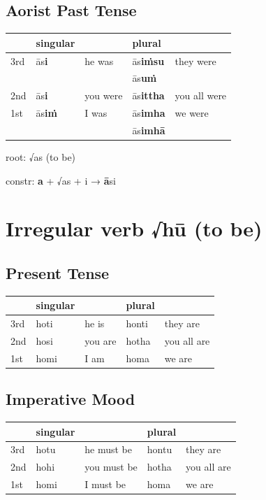 \documentclass[11pt,oneside]{memoir}
\begin{document}
\subsection{Aorist Past Tense}
\label{sec:orgc97d9e9}

\begin{center}
\begin{tabular}{lllll}
 & singular &  & plural & \\
\hline
3rd & ās\textbf{i} & he was & ās\textbf{iṁsu} & they were\\
 &  &  & ās\textbf{uṁ} & \\
2nd & ās\textbf{i} & you were & ās\textbf{ittha} & you all were\\
1st & ās\textbf{iṁ} & I was & ās\textbf{imha} & we were\\
 &  &  & ās\textbf{imhā} & \\
\end{tabular}
\end{center}

root: √as (to be)

constr: \textbf{a} + √as + i → \textbf{ā}si

\clearpage
\section{Irregular verb √hū (to be)}
\label{sec:orgb8c851c}
\subsection{Present Tense}
\label{sec:org320b42c}

\begin{center}
\begin{tabular}{lllll}
 & singular &  & plural & \\
\hline
3rd & hoti & he is & honti & they are\\
2nd & hosi & you are & hotha & you all are\\
1st & homi & I am & homa & we are\\
\end{tabular}
\end{center}
\subsection{Imperative Mood}
\label{sec:org8cfbb29}

\begin{center}
\begin{tabular}{lllll}
 & singular &  & plural & \\
\hline
3rd & hotu & he must be & hontu & they are\\
2nd & hohi & you must be & hotha & you all are\\
1st & homi & I must be & homa & we are\\
\end{tabular}
\end{center}
\end{document}
